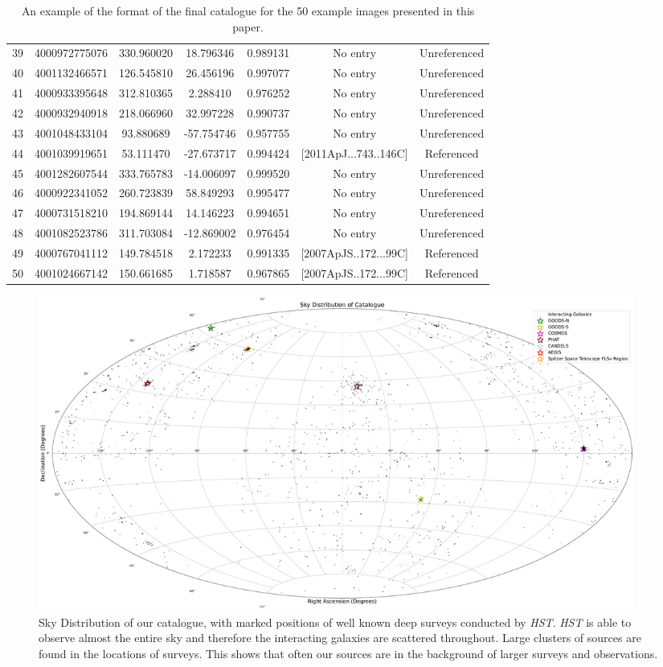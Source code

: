 {\begin{table}
{\begin{tabular}{|c|c|c|c|c|c|c|}
	  39 & 4000972775076 & 330.960020 & 18.796346 & 0.989131 & No entry & Unreferenced \\
	  40 & 4001132466571 & 126.545810 & 26.456196 & 0.997077 & No entry &  Unreferenced \\
	  41 & 4000933395648 & 312.810365 & 2.288410 & 0.976252 & No entry & Unreferenced \\
	  42 & 4000932940918 & 218.066960 & 32.997228 & 0.990737 & No entry & Unreferenced \\
	  43 & 4001048433104 & 93.880689 & -57.754746 & 0.957755 & No entry & Unreferenced \\
	  44 & 4001039919651 & 53.111470 & -27.673717 & 0.994424 & [2011ApJ...743..146C] & Referenced \\
	  45 & 4001282607544 & 333.765783 & -14.006097 & 0.999520 & No entry & Unreferenced \\
	  46 & 4000922341052 & 260.723839 & 58.849293 & 0.995477 & No entry & Unreferenced \\
	  47 & 4000731518210 & 194.869144 & 14.146223 & 0.994651 & No entry & Unreferenced \\
	  48 & 4001082523786 & 311.703084 & -12.869002 & 0.976454 & No entry & Unreferenced \\
	  49 & 4000767041112 & 149.784518 & 2.172233 & 0.991335 & [2007ApJS..172...99C] & Referenced \\
	  50 & 4001024667142 & 150.661685 & 1.718587 & 0.967865 & [2007ApJS..172...99C] & Referenced \\
	  \hline
	\end{tabular}}
\caption{An example of the format of the final catalogue for the 50 example images presented in this paper.} 
\label{tab:ex-cat}
\end{table}

\begin{figure}
  \includegraphics[width=0.95\textwidth]{Chapter2/figures/fig10.pdf}
  \caption[Sky Distribution of our catalogue, with marked positions of well known deep surveys conducted by \emph{HST}.]{Sky Distribution of our catalogue, with marked positions of well known deep surveys conducted by \emph{HST}. \emph{HST} is able to observe almost the entire sky and therefore the interacting galaxies are scattered throughout. Large clusters of sources are found in the locations of surveys. This shows that often our sources are in the background of larger surveys and observations.}
  \label{fig:sky-distribution}
\end{figure}

}
